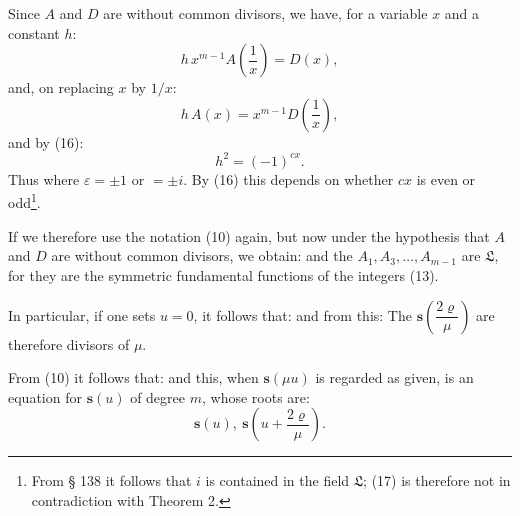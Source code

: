 
Since $A$ and $D$ are without common divisors, we have, for a variable $x$ and a constant $h$:
\[
h\,x^{m-1} A\!\left(\frac{1}{x}\right) = D(x),
\]
and, on replacing $x$ by $1/x$:
\[
h\,A(x) = x^{m-1} D\!\left(\frac{1}{x}\right),
\]
and by (16):
\[
h^2 = (-1)^{cx}.
\]
Thus
where $\varepsilon = \pm 1$ or $= \pm i$. By (16) this depends on whether $cx$ is even or odd\footnote{From § 138 it follows that $i$ is contained in the field $\mathfrak{L}$; (17) is therefore not in contradiction with Theorem 2.}.

If we therefore use the notation (10) again, but now under the hypothesis that $A$ and $D$ are without common divisors, we obtain:
and the $A_1, A_3, \ldots, A_{m-1}$ are  $\mathfrak{L}$, for they are the symmetric fundamental functions of the integers (13).

In particular, if one sets $u=0$, it follows that:
and from this:
The $\boldsymbol{s}\!\left(\dfrac{2\varrho}{\mu}\right)$ are therefore divisors of $\mu$.

From (10) it follows that:
and this, when $\boldsymbol{s}(\mu u)$ is regarded as given, is an equation for $\boldsymbol{s}(u)$ of degree $m$, whose roots are:
\[
\boldsymbol{s}(u),\ \boldsymbol{s}\!\left(u+\frac{2\varrho}{\mu}\right).
\]
